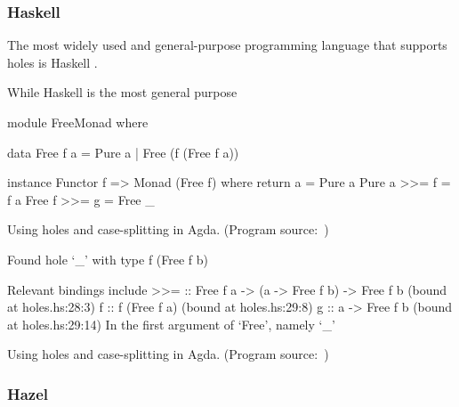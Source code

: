 \subsubsection{Haskell}
The most widely used and general-purpose programming language that supports holes is Haskell \cite{tiobe_software_bv_tiobe_2023, stack_overflow_stack_2023}.

\cite{gamari_haskell_2019}
\cite{gissurarson_suggesting_2018}
\cite{redmond_toward_2021}

While Haskell is the most general purpose 

\begin{program}[ht]
\begin{GenericCode}
module FreeMonad where

data Free f a
  = Pure a
  | Free (f (Free f a))

instance Functor f => Monad (Free f) where
  return a     = Pure a
  Pure a >>= f = f a
  Free f >>= g = Free _
\end{GenericCode}
\caption{Using holes and case-splitting in Agda. (Program source:~\cite{the_agda_team_holes_2023})}
\label{prg:agda-holes}
\end{program}

\begin{program}[ht]
\begin{GenericCode}
Found hole `_' with type f (Free f b)

Relevant bindings include
  >>= :: Free f a -> (a -> Free f b) -> Free f b
    (bound at holes.hs:28:3)
  f :: f (Free f a) (bound at holes.hs:29:8)
  g :: a -> Free f b (bound at holes.hs:29:14)
In the first argument of `Free', namely `_'
\end{GenericCode}
\caption{Using holes and case-splitting in Agda. (Program source:~\cite{the_agda_team_holes_2023})}
\label{prg:agda-holes}
\end{program}

\subsubsection{Hazel}

